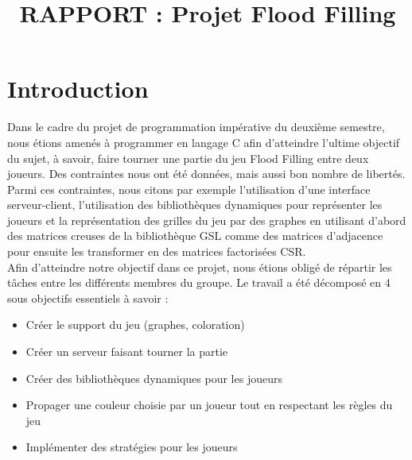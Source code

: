 \documentclass[11pt]{article}
\title{RAPPORT : Projet Flood Filling}
\begin{document}
\newpage
\tableofcontents


\newpage
\section{Introduction}


%
Dans le cadre du projet de programmation impérative du deuxième semestre, nous étions amenés à programmer en langage C afin d'atteindre l'ultime objectif du sujet, à savoir, faire tourner une partie du jeu Flood Filling entre deux joueurs. Des contraintes nous ont été données, mais aussi bon nombre de libertés. Parmi ces contraintes, nous citons par exemple l'utilisation d'une interface serveur-client, l'utilisation des bibliothèques dynamiques pour représenter les joueurs et la représentation des grilles du jeu par des graphes en utilisant d'abord des matrices creuses de la bibliothèque GSL comme des matrices d'adjacence pour ensuite les transformer en des matrices factorisées CSR.\\


Afin d'atteindre notre objectif dans ce projet, nous étions obligé de répartir les tâches entre les différents membres du groupe. Le travail a été décomposé en 4 sous objectifs essentiels à savoir :
\begin{itemize}
    \item Créer le support du jeu (graphes, coloration)
    \item Créer un serveur faisant tourner la partie
    \item Créer des bibliothèques dynamiques pour les joueurs
    \item Propager une couleur choisie par un joueur tout en respectant les règles du jeu
    \item Implémenter des stratégies pour les joueurs
\end{itemize}
\end{document}
